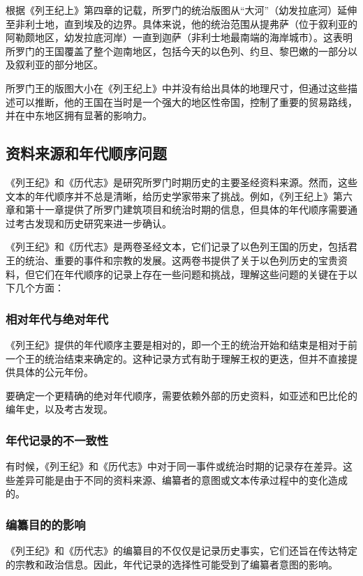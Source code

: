 \documentclass[12pt, a4paper]{ctexart}
\begin{document}
根据《列王纪上》第四章的记载，所罗门的统治版图从“大河”（幼发拉底河）延伸至非利士地，直到埃及的边界。具体来说，他的统治范围从提弗萨（位于叙利亚的阿勒颇地区，幼发拉底河岸）一直到迦萨（非利士地最南端的海岸城市）。这表明所罗门的王国覆盖了整个迦南地区，包括今天的以色列、约旦、黎巴嫩的一部分以及叙利亚的部分地区。

所罗门王的版图大小在《列王纪上》中并没有给出具体的地理尺寸，但通过这些描述可以推断，他的王国在当时是一个强大的地区性帝国，控制了重要的贸易路线，并在中东地区拥有显著的影响力。

\subsection{资料来源和年代顺序问题}
《列王纪》和《历代志》是研究所罗门时期历史的主要圣经资料来源。然而，这些文本的年代顺序并不总是清晰，给历史学家带来了挑战。例如，《列王纪上》第六章和第十一章提供了所罗门建筑项目和统治时期的信息，但具体的年代顺序需要通过考古发现和历史研究来进一步确认。

《列王纪》和《历代志》是两卷圣经文本，它们记录了以色列王国的历史，包括君王的统治、重要的事件和宗教的发展。这两卷书提供了关于以色列历史的宝贵资料，但它们在年代顺序的记录上存在一些问题和挑战，理解这些问题的关键在于以下几个方面：

\subsubsection{相对年代与绝对年代}
《列王纪》提供的年代顺序主要是相对的，即一个王的统治开始和结束是相对于前一个王的统治结束来确定的。这种记录方式有助于理解王权的更迭，但并不直接提供具体的公元年份。

要确定一个更精确的绝对年代顺序，需要依赖外部的历史资料，如亚述和巴比伦的编年史，以及考古发现。

\subsubsection{年代记录的不一致性}
有时候，《列王纪》和《历代志》中对于同一事件或统治时期的记录存在差异。这些差异可能是由于不同的资料来源、编纂者的意图或文本传承过程中的变化造成的。

\subsubsection{编纂目的的影响}
《列王纪》和《历代志》的编纂目的不仅仅是记录历史事实，它们还旨在传达特定的宗教和政治信息。因此，年代记录的选择性可能受到了编纂者意图的影响。
\end{document}
